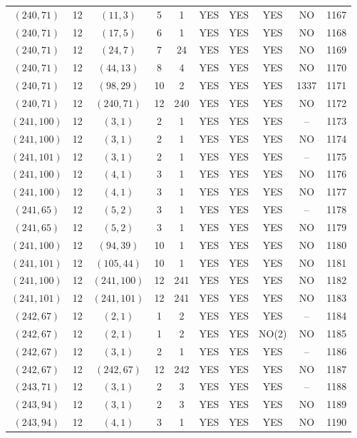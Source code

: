 \begin{longtable}{|c|c|c|c|c|c|c|c|c|c|}
$(240, 71)$ & 12 & $(11, 3)$ & 5 & 1 & YES & YES & YES & NO & 1167\\
$(240, 71)$ & 12 & $(17, 5)$ & 6 & 1 & YES & YES & YES & NO & 1168\\
$(240, 71)$ & 12 & $(24, 7)$ & 7 & 24 & YES & YES & YES & NO & 1169\\
$(240, 71)$ & 12 & $(44, 13)$ & 8 & 4 & YES & YES & YES & NO & 1170\\
$(240, 71)$ & 12 & $(98, 29)$ & 10 & 2 & YES & YES & YES & 1337 & 1171\\
$(240, 71)$ & 12 & $(240, 71)$ & 12 & 240 & YES & YES & YES & NO & 1172\\
$(241, 100)$ & 12 & $(3, 1)$ & 2 & 1 & YES & YES & YES & -- & 1173\\
$(241, 100)$ & 12 & $(3, 1)$ & 2 & 1 & YES & YES & YES & NO & 1174\\
$(241, 101)$ & 12 & $(3, 1)$ & 2 & 1 & YES & YES & YES & -- & 1175\\
$(241, 100)$ & 12 & $(4, 1)$ & 3 & 1 & YES & YES & YES & NO & 1176\\
$(241, 100)$ & 12 & $(4, 1)$ & 3 & 1 & YES & YES & YES & NO & 1177\\
$(241, 65)$ & 12 & $(5, 2)$ & 3 & 1 & YES & YES & YES & -- & 1178\\
$(241, 65)$ & 12 & $(5, 2)$ & 3 & 1 & YES & YES & YES & NO & 1179\\
$(241, 100)$ & 12 & $(94, 39)$ & 10 & 1 & YES & YES & YES & NO & 1180\\
$(241, 101)$ & 12 & $(105, 44)$ & 10 & 1 & YES & YES & YES & NO & 1181\\
$(241, 100)$ & 12 & $(241, 100)$ & 12 & 241 & YES & YES & YES & NO & 1182\\
$(241, 101)$ & 12 & $(241, 101)$ & 12 & 241 & YES & YES & YES & NO & 1183\\
$(242, 67)$ & 12 & $(2, 1)$ & 1 & 2 & YES & YES & YES & -- & 1184\\
$(242, 67)$ & 12 & $(2, 1)$ & 1 & 2 & YES & YES & NO(2) & NO & 1185\\
$(242, 67)$ & 12 & $(3, 1)$ & 2 & 1 & YES & YES & YES & -- & 1186\\
$(242, 67)$ & 12 & $(242, 67)$ & 12 & 242 & YES & YES & YES & NO & 1187\\
$(243, 71)$ & 12 & $(3, 1)$ & 2 & 3 & YES & YES & YES & -- & 1188\\
$(243, 94)$ & 12 & $(3, 1)$ & 2 & 3 & YES & YES & YES & NO & 1189\\
$(243, 94)$ & 12 & $(4, 1)$ & 3 & 1 & YES & YES & YES & NO & 1190\\

\end{longtable}
